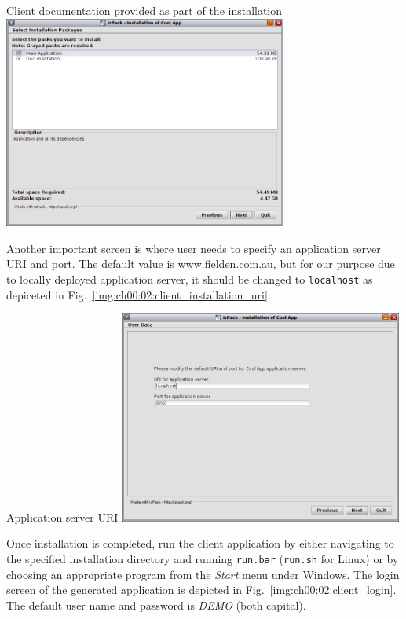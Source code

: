   \begin{image}{Client documentation provided as part of the installation}{\label{img:ch00:02:client_installation_doc}}    
    \includegraphics[width=0.7\textwidth]{parts/00-part/chapters/01-application-modules/images/02-client-installation-doc.png}
  \end{image}

  Another important screen is where user needs to specify an application server URI and port.
  The default value is \url{www.fielden.com.au}, but for our purpose due to locally deployed application server, it should be changed to \texttt{localhost} as depiceted in Fig.~\ref{img:ch00:02:client_installation_uri}.

  \begin{image}{Application server URI}{\label{img:ch00:02:client_installation_uri}}    
    \includegraphics[width=0.7\textwidth]{parts/00-part/chapters/01-application-modules/images/03-client-installation-uri.png}
  \end{image}
  
  Once installation is completed, run the client application by either navigating to the specified installation directory and running \texttt{run.bar} (\texttt{run.sh} for Linux) or by choosing an appropriate program from the \emph{Start} menu under Windows.
  The login screen of the generated application is depicted in Fig.~\ref{img:ch00:02:client_login}.
  The default user name and password is \emph{DEMO} (both capital).

